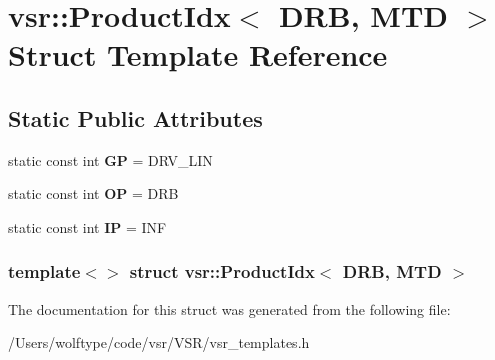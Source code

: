 \hypertarget{structvsr_1_1_product_idx_3_01_d_r_b_00_01_m_t_d_01_4}{\section{vsr\-:\-:Product\-Idx$<$ D\-R\-B, M\-T\-D $>$ Struct Template Reference}
\label{structvsr_1_1_product_idx_3_01_d_r_b_00_01_m_t_d_01_4}
}
\subsection*{Static Public Attributes}
\begin{DoxyCompactItemize}
\item 
\hypertarget{structvsr_1_1_product_idx_3_01_d_r_b_00_01_m_t_d_01_4_a37219306de2d98da81ebc780c72f896c}{static const int {\bfseries G\-P} = D\-R\-V\-\_\-\-L\-I\-N}\label{structvsr_1_1_product_idx_3_01_d_r_b_00_01_m_t_d_01_4_a37219306de2d98da81ebc780c72f896c}

\item 
\hypertarget{structvsr_1_1_product_idx_3_01_d_r_b_00_01_m_t_d_01_4_a3ffd69082c3fcb177495f7d77719c8a1}{static const int {\bfseries O\-P} = D\-R\-B}\label{structvsr_1_1_product_idx_3_01_d_r_b_00_01_m_t_d_01_4_a3ffd69082c3fcb177495f7d77719c8a1}

\item 
\hypertarget{structvsr_1_1_product_idx_3_01_d_r_b_00_01_m_t_d_01_4_aeedb8213c51d9e58f495297a332e048c}{static const int {\bfseries I\-P} = I\-N\-F}\label{structvsr_1_1_product_idx_3_01_d_r_b_00_01_m_t_d_01_4_aeedb8213c51d9e58f495297a332e048c}

\end{DoxyCompactItemize}
\subsubsection*{template$<$$>$ struct vsr\-::\-Product\-Idx$<$ D\-R\-B, M\-T\-D $>$}



The documentation for this struct was generated from the following file\-:\begin{DoxyCompactItemize}
\item 
/\-Users/wolftype/code/vsr/\-V\-S\-R/vsr\-\_\-templates.\-h\end{DoxyCompactItemize}
